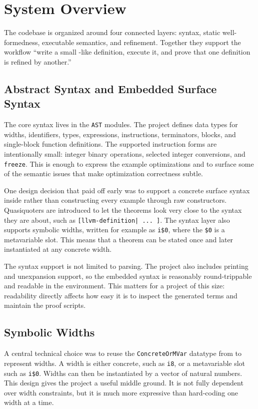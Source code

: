 \section{System Overview}
\label{sec:system}

The codebase is organized around four connected layers: syntax, static
well-formedness, executable semantics, and refinement. Together they support
the workflow ``write a small \llvm-like definition, execute it, and prove that
one definition is refined by another.''

\subsection{Abstract Syntax and Embedded Surface Syntax}

The core syntax lives in the \texttt{AST} modules. The project defines \lean
data types for widths, identifiers, types, expressions, instructions,
terminators, blocks, and single-block function definitions. The supported
instruction forms are intentionally small: integer binary operations,
selected integer conversions, and \texttt{freeze}. This is enough to express
the example optimizations and to surface some of the semantic issues that
make \llvm optimization correctness subtle.

One design decision that paid off early was to support a concrete surface
syntax inside \lean rather than constructing every example through raw
constructors. Quasiquoters are introduced to let the theorems look very
close to the \llvm syntax they are about, such as \texttt{[llvm-definition| ... ]}.
The syntax layer also supports symbolic widths,
written for example as \texttt{i\$0}, where the \texttt{\$0} is a
metavariable slot.
This means that a theorem can be stated
once and later instantiated at any concrete width.

The syntax support is not limited to parsing. The project also includes
printing and unexpansion support, so the embedded syntax is reasonably
round-trippable and readable in the \lean environment. This matters for a
project of this size: readability directly affects how easy it is to inspect
the generated terms and maintain the proof scripts.

\subsection{Symbolic Widths}

A central technical choice was to reuse the
\texttt{ConcreteOrMVar} datatype from \leanmlir to represent widths.
A width is either concrete, such as
\texttt{i8}, or a metavariable slot such as \texttt{i\$0}. Widths can then be
instantiated by a vector of natural numbers. This design gives the project a
useful middle ground. It is not fully dependent over width constraints, but
it is much more expressive than hard-coding one width at a time.

